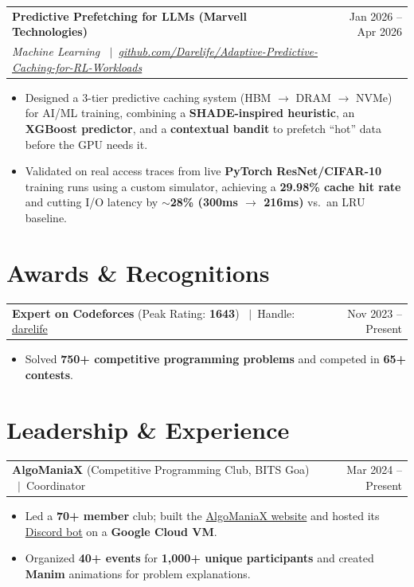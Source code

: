 \documentclass[10pt,letterpaper]{article}
\makeatletter
\newcommand{\resumeSubheading}[4]{
  \vspace{1.5pt}
  \noindent
  \begin{tabularx}{\linewidth}{@{}X r@{}}
    \textbf{#1} & #2 \\
    \textit{\small#3} & \textit{\small#4} \\
  \end{tabularx}\vspace{-1.5pt}
}
\newcommand{\resumeProjectHeading}[2]{
  \vspace{1.5pt}
  \noindent
  \begin{tabularx}{\linewidth}{@{}X r@{}}
    #1 & #2 \\
  \end{tabularx}\vspace{-1.5pt}
}
\makeatother
\begin{document}
\vspace{2pt}
\resumeSubheading
    {Predictive Prefetching for LLMs (Marvell Technologies)}{Jan 2026 -- Apr 2026}
    {Machine Learning \ $\vert$\ \href{https://github.com/Darelife/Adaptive-Predictive-Caching-for-RL-Workloads}{github.com/Darelife/Adaptive-Predictive-Caching-for-RL-Workloads}}{}
\begin{itemize}
    \vspace{1pt}
    \item Designed a 3-tier predictive caching system (HBM \(\to\) DRAM \(\to\) NVMe) for AI/ML training, combining a \textbf{SHADE-inspired heuristic}, an \textbf{XGBoost predictor}, and a \textbf{contextual bandit} to prefetch ``hot'' data before the GPU needs it.
    \item Validated on real access traces from live \textbf{PyTorch ResNet/CIFAR-10} training runs using a custom simulator, achieving a \textbf{29.98\% cache hit rate} and cutting I/O latency by \textbf{$\sim$28\% (300ms \(\to\) 216ms)} vs.\ an LRU baseline.
\end{itemize}

\section*{Awards \& Recognitions}
\resumeProjectHeading{\textbf{Expert on Codeforces} (Peak Rating: \textbf{1643}) \ $\vert$\ Handle: \href{https://codeforces.com/profile/darelife}{darelife}}{Nov 2023 -- Present}
\begin{itemize}
    \item Solved \textbf{750+ competitive programming problems} and competed in \textbf{65+ contests}.
\end{itemize}

\section*{Leadership \& Experience}
\resumeProjectHeading{\textbf{AlgoManiaX} (Competitive Programming Club, BITS Goa) \ $\vert$\ Coordinator}{Mar 2024 -- Present}
\begin{itemize}
    \item Led a \textbf{70+ member} club; built the \href{https://algomaniax.vercel.app/}{AlgoManiaX website} and hosted its \href{https://github.com/darelife/synanit2.0}{Discord bot} on a \textbf{Google Cloud VM}.
    \item Organized \textbf{40+ events} for \textbf{1,000+ unique participants} and created \textbf{Manim} animations for problem explanations.
\end{itemize}
\end{document}
